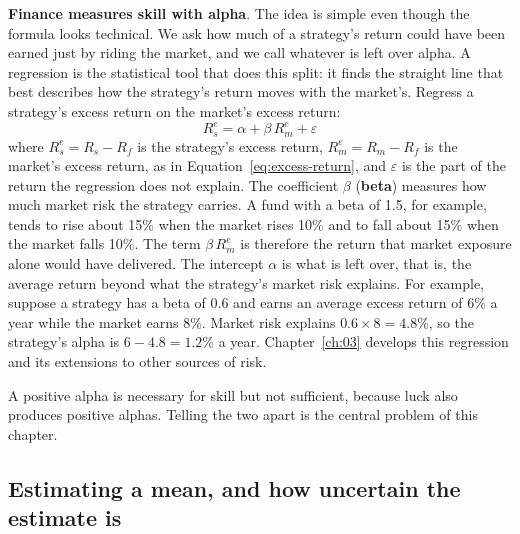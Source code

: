 \textbf{Finance measures skill with alpha}. The idea is simple even though the formula looks technical. We ask how much of a strategy's return could have been earned just by riding the market, and we call whatever is left over alpha. A regression is the statistical tool that does this split: it finds the straight line that best describes how the strategy's return moves with the market's. Regress a strategy's excess return on the market's excess return:
\begin{equation}
  R^{e}_{s} = \alpha + \beta\, R^{e}_{m} + \varepsilon \nonumber
\label{eq:ch01_beta}
\end{equation}
where $R^{e}_{s} = R_s - R_f$ is the strategy's excess return, $R^{e}_{m} = R_m - R_f$ is the market's excess return, as in Equation~\eqref{eq:excess-return}, and $\varepsilon$ is the part of the return the regression does not explain. The coefficient $\beta$ (\textbf{beta}) measures how much market risk the strategy carries. A fund with a beta of 1.5, for example, tends to rise about 15\% when the market rises 10\% and to fall about 15\% when the market falls 10\%. The term $\beta\, R^{e}_{m}$ is therefore the return that market exposure alone would have delivered. The intercept $\alpha$ is what is left over, that is, the average return beyond what the strategy's market risk explains. For example, suppose a strategy has a beta of 0.6 and earns an average excess return of 6\% a year while the market earns 8\%. Market risk explains $0.6 \times 8 = 4.8$\%, so the strategy's alpha is $6 - 4.8 = 1.2$\% a year. Chapter~\ref{ch:03} develops this regression and its extensions to other sources of risk.

A positive alpha is necessary for skill but not sufficient, because luck also produces positive alphas. Telling the two apart is the central problem of this chapter.

\subsection{Estimating a mean, and how uncertain the estimate is}
\label{sec:01-se}

